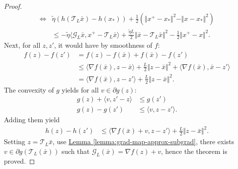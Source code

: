 \documentclass[12pt]{article}
\begin{document}
\begin{proof}
{\begin{align*}
            \iff &
            \tilde \eta (h(\mathcal T_L\bar x) - h(x_*))  
            + 
            \frac{1}{2}\left(
                \Vert x^+ - x_*\Vert^2 - 
                \Vert x - x_*\Vert^2
            \right)
            \\
            & \le 
            - \tilde \eta \langle \mathcal G_L\bar x, x^+ - \mathcal T_L \bar x\rangle
            + 
            \frac{\tilde \eta L}{2} \Vert \bar x - \mathcal T_L \bar x\Vert^2
            - 
            \frac{1}{2}\Vert x^+ - x\Vert^2. 
        \end{align*}
        }
        Next, for all $z, z'$, it would have by smoothness of $f$: 
        \begin{align*}
            f(z) - f(z') &= 
            f(z) - f(\bar x) + f(\bar x) - f(z')
            \\
            &\le 
            \langle 
                \nabla f(\bar x), z - \bar x
            \rangle + 
            \frac{L}{2}\Vert z - \bar x\Vert^2 
            + 
            \langle 
                \nabla f(\bar x), 
                \bar x - z'
            \rangle
            \\
            &= 
            \langle \nabla f(\bar x), z - z'\rangle
            + 
            \frac{L}{2}\Vert z - \bar x\Vert^2. 
        \end{align*}
        The convexity of $g$ yields for all $v \in \partial g(z)$: 
        \begin{align*}
            g(z) + 
            \langle 
                v, z' - z
            \rangle 
            &\le g(z')
            \\
            g(z) - g(z') 
            &\le 
            \langle v, z - z'\rangle. 
        \end{align*}
        Adding them yield 
        \begin{align*}
            h(z) - h(z') &\le 
            \langle \nabla f(\bar x) +v, z - z'\rangle + 
            \frac{L}{2}\Vert z - \bar x\Vert^2. 
        \end{align*}
        Setting $z = \mathcal T_L \bar x$, use 
        \hyperref[lemma:grad-map-approx-subgrad]
        {Lemma \ref*{lemma:grad-map-approx-subgrad}}, 
        there exists $v \in \partial g (\mathcal T_L(\bar x))$ such that $\mathcal G_L(\bar x) = \nabla f(z) + v$, hence the theorem is proved. 
    \end{proof}
\end{document}
